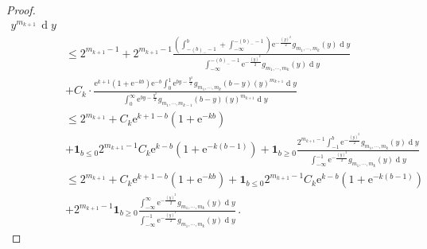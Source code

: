 \documentclass[10pt,a4paper]{amsart}
\newcommand{\diff}{\ensuremath{\operatorname{d}\!}}
\begin{document}
\begin{proof}
\begin{align*}
{    y^{m_{k+1}} \, \diff y
}\\
&\displaystyle\le 2^{m_{k+1}-1} + 2^{m_{k+1}-1}\frac{\left(\int^b_{-(b)_- -1}+\int^{-(b)_- -1}_{-\infty}\right)\mathrm{e}^{-\frac{(y)^2}{2}} g_{m_1, \cdots, m_{k}}(y)\diff y}{\int^{-(b)_- -1}_{-\infty}\mathrm{e}^{-\frac{(y)^2}{2}} g_{m_1, \cdots, m_{k}}(y)\diff y}\\
         &\displaystyle +C_k\cdot\frac{\mathrm{e}^{k+1}(1+\mathrm{e}^{-kb}) \mathrm{e}^{-b}\int^1_{0}\mathrm{e}^{by-\frac{y^2}{2}}g_{m_1, \cdots, m_{k}}(b-y)(y)^{m_{k+1}}\diff y}{\int^\infty_{0}\mathrm{e}^{by-\frac{y^2}{2}} g_{m_1, \cdots, m_{k-1}}(b-y)(y)^{m_{k+1}}\diff y}\\
         &\displaystyle\le 2^{m_{k+1}} +C_k\mathrm{e}^{k+1-b} (1+\mathrm{e}^{-kb})\\
         &\displaystyle+\mathbf{1}_{b\le 0}2^{m_{k+1}-1}C_k\mathrm{e}^{k-b} (1+\mathrm{e}^{-k(b-1)})+\mathbf{1}_{b\ge0}\frac{2^{m_{k+1}-1}\int^b_{ -1}\mathrm{e}^{-\frac{(y)^2}{2}} g_{m_1, \cdots, m_{k}}(y)\diff y}{\int^{-1}_{-\infty}\mathrm{e}^{-\frac{(y)^2}{2}} g_{m_1, \cdots, m_{k}}(y)\diff y}\\
         &\displaystyle\le 2^{m_{k+1}} + C_k\mathrm{e}^{k+1-b} (1+\mathrm{e}^{-kb})+ \mathbf{1}_{b\le 0}2^{m_{k+1}-1}C_k\mathrm{e}^{k-b} (1+\mathrm{e}^{-k(b-1)})\\
         &+ 2^{m_{k+1}-1}\mathbf{1}_{b\ge0}\frac{\int^\infty_{ -\infty}\mathrm{e}^{-\frac{(y)^2}{2}} g_{m_1, \cdots, m_{k}}(y)\diff y}{\int^{-1}_{-\infty}\mathrm{e}^{-\frac{(y)^2}{2}} g_{m_1, \cdots, m_{k}}(y)\diff y}\,. 
\end{align*}


\end{proof}
\end{document}
